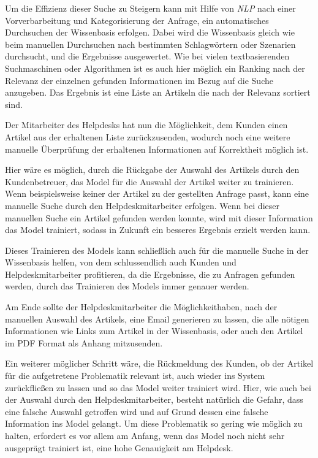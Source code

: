 Um die Effizienz dieser Suche zu Steigern kann mit Hilfe von \textit{NLP} nach einer Vorverbarbeitung und Kategorisierung der Anfrage, ein automatisches Durchsuchen der Wissenbasis erfolgen. Dabei wird die Wissenbasis gleich wie beim manuellen Durchsuchen nach bestimmten Schlagwörtern oder Szenarien durchsucht, und die Ergebnisse ausgewertet. Wie bei vielen textbasierenden Suchmaschinen oder Algorithmen ist es auch hier möglich ein Ranking nach der Relevanz der einzelnen gefunden Informationen im Bezug auf die Suche anzugeben. Das Ergebnis ist eine Liste an Artikeln die nach der Relevanz sortiert sind.

Der Mitarbeiter des Helpdesks hat nun die Möglichkeit, dem Kunden einen Artikel aus der erhaltenen Liste zurückzusenden, wodurch noch eine weitere manuelle Überprüfung der erhaltenen Informationen auf Korrektheit möglich ist. 

Hier wäre es möglich, durch die Rückgabe der Auswahl des Artikels durch den Kundenbetreuer, das Model für die Auswahl der Artikel weiter zu trainieren. Wenn beispielsweise keiner der Artikel zu der gestellten Anfrage passt, kann eine manuelle Suche durch den Helpdeskmitarbeiter erfolgen. Wenn bei dieser manuellen Suche ein Artikel gefunden werden konnte, wird mit dieser Information das Model trainiert, sodass in Zukunft ein besseres Ergebnis erzielt werden kann.

Dieses Trainieren des Models kann schließlich auch für die manuelle Suche in der Wissenbasis helfen, von dem schlussendlich auch Kunden und Helpdeskmitarbeiter profitieren, da die Ergebnisse, die zu Anfragen gefunden werden, durch das Trainieren des Models immer genauer werden.

Am Ende sollte der Helpdeskmitarbeiter die Möglichkeithaben, nach der manuellen Auswahl des Artikels, eine Email generieren zu lassen, die alle nötigen Informationen wie Links zum Artikel in der Wissenbasis, oder auch den Artikel im PDF Format als Anhang mitzusenden. 

Ein weiterer möglicher Schritt wäre, die Rückmeldung des Kunden, ob der Artikel für die aufgetretene Problematik relevant ist, auch wieder ins System zurückfließen zu lassen und so das Model weiter trainiert wird. Hier, wie auch bei der Auswahl durch den Helpdeskmitarbeiter, besteht natürlich die Gefahr, dass eine falsche Auswahl getroffen wird und auf Grund dessen eine falsche Information ins Model gelangt. Um diese Problematik so gering wie möglich zu halten, erfordert es vor allem am Anfang, wenn das Model noch nicht sehr ausgeprägt trainiert ist, eine hohe Genauigkeit am Helpdesk.

